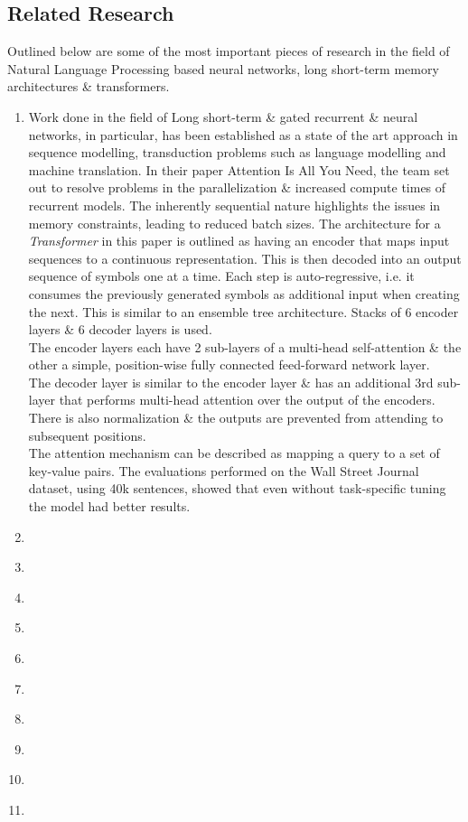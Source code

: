 \documentclass[11pt]{article}
\begin{document}
\subsection{Related Research}\label{rr}
Outlined below are some of the most important pieces of research in the field of Natural Language Processing based neural networks, long short-term memory architectures \& transformers.
\begin{enumerate}
    \item Work done in the field of Long short-term \& gated recurrent \citep{lstm} \& \citep{recurrent} neural networks, in particular, has been established as a state of the art approach in sequence modelling, transduction problems such as language modelling and machine translation.
    In their paper Attention Is All You Need,\citep{atayl} the team set out to resolve problems in the parallelization \& increased compute times of recurrent models. The inherently sequential nature highlights the issues in memory constraints, leading to reduced batch sizes.
    The architecture for a \textit{Transformer} in this paper is outlined as having an encoder that maps input sequences to a continuous representation. This is then decoded into an output sequence of symbols one at a time. Each step is auto-regressive, i.e. it consumes the previously generated symbols as additional input when creating the next. This is similar to an ensemble tree architecture. Stacks of 6 encoder layers \& 6 decoder layers is used.\\
    The encoder layers each have 2 sub-layers of a multi-head self-attention \& the other a simple, position-wise fully connected feed-forward network layer.\\
    The decoder layer is similar to the encoder layer \& has an additional 3rd sub-layer that performs multi-head attention over the output of the encoders. There is also normalization \&  the outputs are prevented from attending to subsequent positions. \\ The attention mechanism can be described as mapping a query to a set of key-value pairs\citep{atayl}. The evaluations performed on the Wall Street Journal dataset\citep{wsj}, using 40k sentences, showed that even without task-specific tuning the model had better results.

    \item \citep{dataset}
    \item \citep{bert}
    \item \citep{roberta}
    \item \citep{albert}
    \item \citep{schmid}
    \item \citep{levy}
    \item \citep{contextual}
    \item \citep{lstm}
    \item \citep{zhang}
    \item \citep{fastQA}
\end{enumerate}
\end{document}

